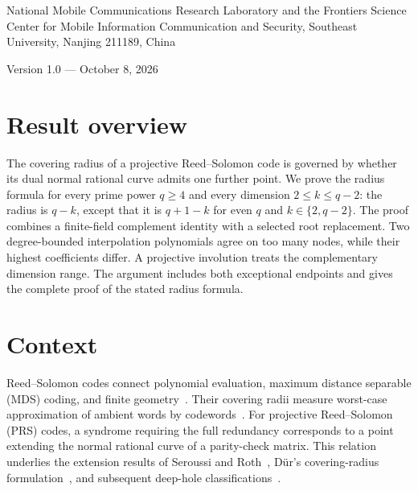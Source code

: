 \documentclass[12pt,letterpaper,onecolumn]{article}
\theoremstyle{definition}
\begin{document}
\par\medskip
{}\medskip
{}\par\smallskip
\noindent\begin{minipage}{\linewidth}\small National Mobile Communications Research Laboratory and the Frontiers Science Center for Mobile Information Communication and Security, Southeast University, Nanjing 211189, China\end{minipage}\par\medskip
\noindent Version 1.0 --- October 8, 2026\par\bigskip
{}
\section*{Result overview}
The covering radius of a projective Reed--Solomon code is governed by whether its dual normal rational curve admits one further point. We prove the radius formula for every prime power $q\ge4$ and every dimension $2\le k\le q-2$: the radius is $q-k$, except that it is $q+1-k$ for even $q$ and $k\in\{2,q-2\}$. The proof combines a finite-field complement identity with a selected root replacement. Two degree-bounded interpolation polynomials agree on too many nodes, while their highest coefficients differ. A projective involution treats the complementary dimension range. The argument includes both exceptional endpoints and gives the complete proof of the stated radius formula.
\section{Context}
Reed--Solomon codes connect polynomial evaluation, maximum distance separable (MDS) coding, and finite geometry~\cite{reed1960}. Their covering radii measure worst-case approximation of ambient words by codewords~\cite{huffman2003}. For projective Reed--Solomon (PRS) codes, a syndrome requiring the full redundancy corresponds to a point extending the normal rational curve of a parity-check matrix. This relation underlies the extension results of Seroussi and Roth~\cite{seroussi1986}, D\"ur's covering-radius formulation~\cite{dur1994}, and subsequent deep-hole classifications~\cite{zhang2020}.
\end{document}
